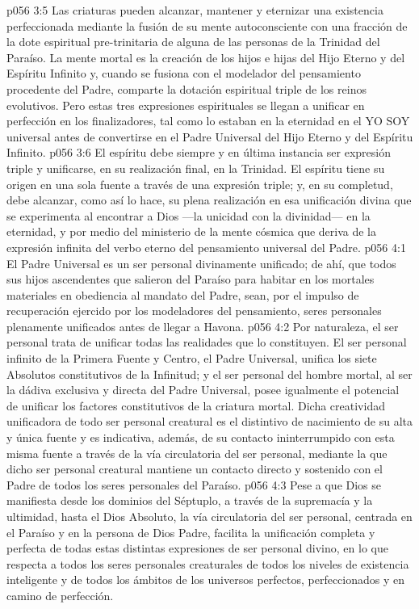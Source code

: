 \vs p056 3:5 \pc Las criaturas pueden alcanzar, mantener y eternizar una existencia perfeccionada mediante la fusión de su mente autoconsciente con una fracción de la dote espiritual pre\hyp{}trinitaria de alguna de las personas de la Trinidad del Paraíso. La mente mortal es la creación de los hijos e hijas del Hijo Eterno y del Espíritu Infinito y, cuando se fusiona con el modelador del pensamiento procedente del Padre, comparte la dotación espiritual triple de los reinos evolutivos. Pero estas tres expresiones espirituales se llegan a unificar en perfección en los finalizadores, tal como lo estaban en la eternidad en el YO SOY universal antes de convertirse en el Padre Universal del Hijo Eterno y del Espíritu Infinito.
\vs p056 3:6 El espíritu debe siempre y en última instancia ser expresión triple y unificarse, en su realización final, en la Trinidad. El espíritu tiene su origen en una sola fuente a través de una expresión triple; y, en su completud, debe alcanzar, como así lo hace, su plena realización en esa unificación divina que se experimenta al encontrar a Dios ---la unicidad con la divinidad--- en la eternidad, y por medio del ministerio de la mente cósmica que deriva de la expresión infinita del verbo eterno del pensamiento universal del Padre.
\vs p056 4:1 El Padre Universal es un ser personal divinamente unificado; de ahí, que todos sus hijos ascendentes que salieron del Paraíso para habitar en los mortales materiales en obediencia al mandato del Padre, sean, por el impulso de recuperación ejercido por los modeladores del pensamiento, seres personales plenamente unificados antes de llegar a Havona.
\vs p056 4:2 Por naturaleza, el ser personal trata de unificar todas las realidades que lo constituyen. El ser personal infinito de la Primera Fuente y Centro, el Padre Universal, unifica los siete Absolutos constitutivos de la Infinitud; y el ser personal del hombre mortal, al ser la dádiva exclusiva y directa del Padre Universal, posee igualmente el potencial de unificar los factores constitutivos de la criatura mortal. Dicha creatividad unificadora de todo ser personal creatural es el distintivo de nacimiento de su alta y única fuente y es indicativa, además, de su contacto ininterrumpido con esta misma fuente a través de la vía circulatoria del ser personal, mediante la que dicho ser personal creatural mantiene un contacto directo y sostenido con el Padre de todos los seres personales del Paraíso.
\vs p056 4:3 Pese a que Dios se manifiesta desde los dominios del Séptuplo, a través de la supremacía y la ultimidad, hasta el Dios Absoluto, la vía circulatoria del ser personal, centrada en el Paraíso y en la persona de Dios Padre, facilita la unificación completa y perfecta de todas estas distintas expresiones de ser personal divino, en lo que respecta a todos los seres personales creaturales de todos los niveles de existencia inteligente y de todos los ámbitos de los universos perfectos, perfeccionados y en camino de perfección.
